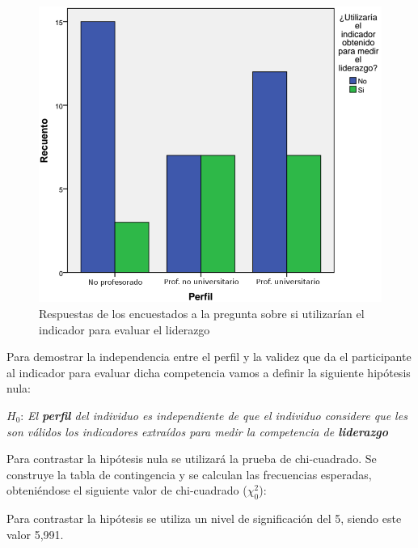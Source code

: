 \begin{figure}
  \begin{center}
    \includegraphics[scale=0.3]{barras_perfil_liderazgo.png}
  \end{center}
  \caption{Respuestas de los encuestados a la pregunta sobre si utilizarían el indicador para evaluar el liderazgo}
  \label{fig:app:barras:perfil:liderazgo}
\end{figure}

Para demostrar la independencia entre el perfil y la validez que da el participante al indicador para evaluar dicha competencia vamos a definir la siguiente hipótesis nula:

\begin{mdframed}[style=hipotesis0]
$H_0$: \emph{El \textbf{perfil} del individuo es independiente de que el individuo considere que les son válidos los indicadores extraídos para medir la competencia de \textbf{liderazgo}}
\end{mdframed}

Para contrastar la hipótesis nula se utilizará la prueba de chi-cuadrado. Se construye la tabla de contingencia y se calculan las frecuencias esperadas, obteniéndose el siguiente valor de chi-cuadrado ($\chi^2_0$): 

\begin{center}
\end{center}

Para contrastar la hipótesis se utiliza un nivel de significación del 5\percentage, siendo este valor 5,991. 

